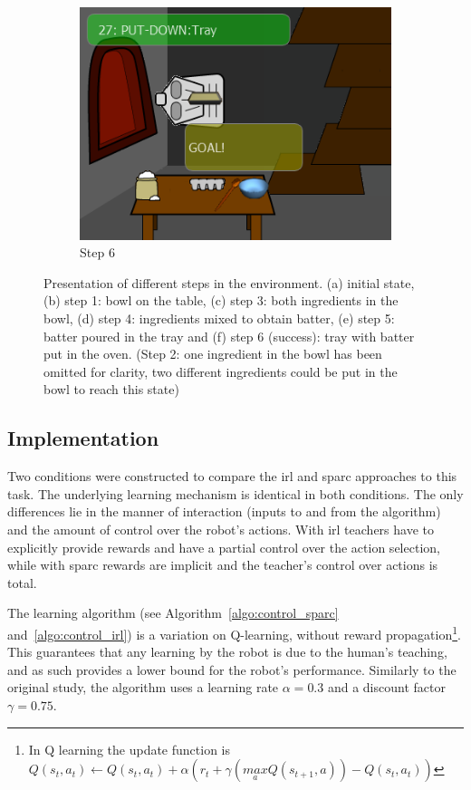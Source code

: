 \begin{figure}[ht]
\begin{subfigure}[b]{0.325\textwidth}
		\includegraphics[width=\textwidth]{step6.png}
		\caption{Step 6}
		\label{fig:control_goal}
	\end{subfigure}
	
	\caption{Presentation of different steps in the environment. (a) initial state, (b) step 1: bowl on the table, (c) step 3: both ingredients in the bowl, (d) step 4: ingredients mixed to obtain batter, (e) step 5: batter poured in the tray and (f) step 6 (success): tray with batter put in the oven. (Step 2: one ingredient in the bowl has been omitted for clarity, two different ingredients could be put in the bowl to reach this state)}
	\label{fig:control_states}
\end{figure}

\subsection{Implementation}

Two conditions were constructed to compare the \gls{irl} and \gls{sparc} approaches to this task. The underlying learning mechanism is identical in both conditions. The only differences lie in the manner of interaction (inputs to and from the algorithm) and the amount of control over the robot's actions. With \gls{irl} teachers have to explicitly provide rewards and have a partial control over the action selection, while with \gls{sparc} rewards are implicit and the teacher's control over actions is total. 

The learning algorithm (see Algorithm~\ref{algo:control_sparc} and~\ref{algo:control_irl}) is a variation on Q-learning, without reward propagation\footnote{In Q learning the update function is $Q(s_{t},a_{t}) \leftarrow Q(s_{t},a_{t}) + \alpha (r_{t}+\gamma (\underset{a}{max} Q(s_{t+1},a))-Q(s_{t},a_{t}))$}. This guarantees that any learning by the robot is due to the human's teaching, and as such provides a lower bound for the robot's performance. %
Similarly to the original study, the algorithm uses a learning rate $\alpha = 0.3$ and a discount factor $\gamma = 0.75$.

